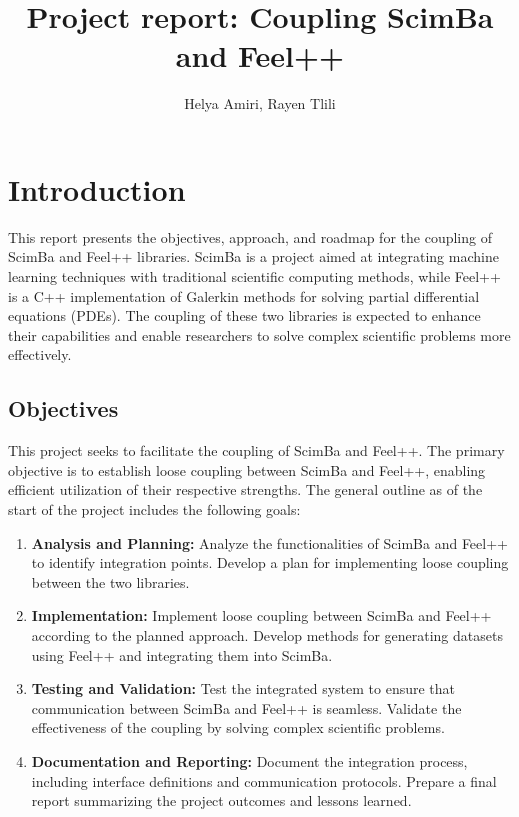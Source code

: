 \documentclass{article}
\title{Project report: Coupling ScimBa and Feel++}
\author{Helya Amiri, Rayen Tlili}
\date{}
\begin{document}
\maketitle

\tableofcontents
\newpage


\section{Introduction}

This report presents the objectives, approach, and roadmap for the coupling of ScimBa and Feel++ libraries. ScimBa is a project aimed at integrating machine learning techniques with traditional scientific computing methods, while Feel++ is a C++ implementation of Galerkin methods for solving partial differential equations (PDEs). The coupling of these two libraries is expected to enhance their capabilities and enable researchers to solve complex scientific problems more effectively.



\subsection{Objectives}

This project seeks to facilitate the coupling of ScimBa and Feel++.
The primary objective is to establish loose coupling between ScimBa and Feel++, enabling efficient utilization of their respective strengths. The general outline as of the start of the project includes the following goals:

\begin{enumerate}
    \item \textbf{Analysis and Planning:} Analyze the functionalities of ScimBa and Feel++ to identify integration points. Develop a plan for implementing loose coupling between the two libraries.
    \item \textbf{Implementation:} Implement loose coupling between ScimBa and Feel++ according to the planned approach. Develop methods for generating datasets using Feel++ and integrating them into ScimBa.
    \item \textbf{Testing and Validation:} Test the integrated system to ensure that communication between ScimBa and Feel++ is seamless. Validate the effectiveness of the coupling by solving complex scientific problems.
    \item \textbf{Documentation and Reporting:} Document the integration process, including interface definitions and communication protocols. Prepare a final report summarizing the project outcomes and lessons learned.
\end{enumerate}
\end{document}

